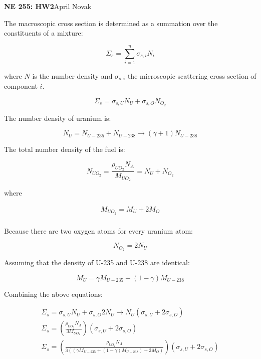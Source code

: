 \documentclass[10pt]{article}
\newcommand*\circled[1]{\tikz[baseline=(char.base)]{
            \node[shape=circle,draw,inner sep=2pt] (char) {#1};}}
\begin{document}
\textbf{NE 255: HW2}\hfill April Novak\newline

\circled{1}\newline

The macroscopic cross section is determined as a summation over the constituents of a mixture:

\begin{equation}
\Sigma_s=\sum_{i=1}^{n}\sigma_{s,i}N_i
\end{equation}

where \(N\) is the number density and \(\sigma_{s,i}\) the microscopic scattering cross section of component \(i\).

\begin{equation}
\Sigma_s=\sigma_{s, U}N_{U}+\sigma_{s,O}N_{O_2}
\end{equation}

The number density of uranium is:

\begin{equation}
N_U=N_{U-235}+N_{U-238}\rightarrow(\gamma+1)N_{U-238}
\end{equation}

The total number density of the fuel is:

\begin{equation}
N_{UO_2}=\frac{\rho_{UO_2}N_A}{M_{UO_2}}=N_U+N_{O_2}
\end{equation}

where

\begin{equation}
\begin{aligned}
M_{UO_2}=M_U+2M_O\\
\end{aligned}
\end{equation}

Because there are two oxygen atoms for every uranium atom:

\begin{equation}
N_{O_2}=2N_U
\end{equation}

Assuming that the density of U-235 and U-238 are identical:

\begin{equation}
M_U=\gamma M_{U-235}+(1-\gamma)M_{U-238}
\end{equation}

Combining the above equations:

\begin{equation}
\begin{aligned}
\Sigma_s=\sigma_{s, U}N_{U}+\sigma_{s,O}2N_U\rightarrow N_U(\sigma_{s, U}+2\sigma_{s,O})\\
\Sigma_s=\left(\frac{\rho_{UO_2}N_A}{3M_{UO_2}}\right)(\sigma_{s, U}+2\sigma_{s,O})\\
\Sigma_s=\left(\frac{\rho_{UO_2}N_A}{3\left((\gamma M_{U-235}+(1-\gamma)M_{U-238})+2M_O\right)}\right)(\sigma_{s, U}+2\sigma_{s,O})\\
\end{aligned}
\end{equation}
\end{document}
